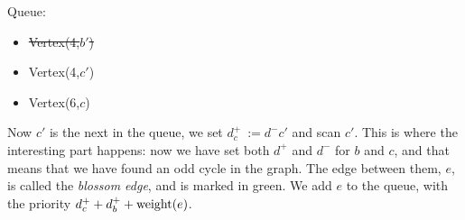 \begin{minipage}{.75\linewidth}
\end{minipage}\hfill%
\begin{minipage}{.26\linewidth}
    Queue:
    \begin{itemize}
        \item \st{Vertex(4,$b'$)}
        \item Vertex(4,$c'$)
        \item Vertex(6,$c$)
    \end{itemize}
\end{minipage}

Now $c'$ is the next in the queue, we set $d^+_c~:= d^-c'$ and scan $c'$. This is where the interesting part happens: now we have set both $d^+$ and $d^-$ for $b$ and $c$, and that means that we have found an odd cycle in the graph. The edge between them, $e$, is called the \emph{blossom edge}, and is marked in green. We add $e$ to the queue, with the priority $d^+_c + d^+_b + \operatorname{weight}(e)$.

